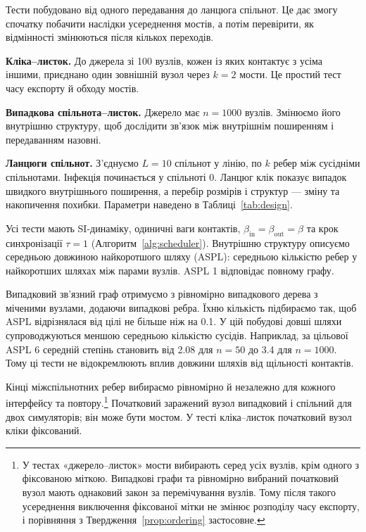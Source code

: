 \documentclass[a4paper,fleqn]{cas-sc}
\begin{document}
Тести побудовано від одного передавання до ланцюга спільнот. Це дає змогу спочатку побачити наслідки усереднення мостів, а потім перевірити, як відмінності змінюються після кількох переходів.
\par \textbf{Кліка--листок.} До джерела зі 100 вузлів, кожен із яких контактує з усіма іншими, приєднано один зовнішній вузол через $k=2$ мости. Це простий тест часу експорту й обходу мостів.
\par \textbf{Випадкова спільнота--листок.} Джерело має $n=1000$ вузлів. Змінюємо його внутрішню структуру, щоб дослідити зв'язок між внутрішнім поширенням і передаванням назовні.
\par \textbf{Ланцюги спільнот.} З'єднуємо $L=10$ спільнот у лінію, по $k$ ребер між сусідніми спільнотами. Інфекція починається у спільноті 0. Ланцюг клік показує випадок швидкого внутрішнього поширення, а перебір розмірів і структур --- зміну та накопичення похибки. Параметри наведено в Таблиці~\ref{tab:design}.
\par Усі тести мають SI-динаміку, одиничні ваги контактів, $\beta_{\mathrm{in}}=\beta_{\mathrm{out}}=\beta$ та крок синхронізації $\tau=1$ (Алгоритм~\ref{alg:scheduler}). Внутрішню структуру описуємо середньою довжиною найкоротшого шляху (ASPL): середньою кількістю ребер у найкоротших шляхах між парами вузлів. ASPL 1 відповідає повному графу.
\par Випадковий зв'язний граф отримуємо з рівномірно випадкового дерева з міченими вузлами, додаючи випадкові ребра. Їхню кількість підбираємо так, щоб ASPL відрізнялася від цілі не більше ніж на 0.1. У цій побудові довші шляхи супроводжуються меншою середньою кількістю сусідів. Наприклад, за цільової ASPL 6 середній степінь становить від 2.08 для $n=50$ до 3.4 для $n=1000$. Тому ці тести не відокремлюють вплив довжини шляхів від щільності контактів.
\par Кінці міжспільнотних ребер вибираємо рівномірно й незалежно для кожного інтерфейсу та повтору.\footnote{У тестах «джерело--листок» мости вибирають серед усіх вузлів, крім одного з фіксованою міткою. Випадкові графи та рівномірно вибраний початковий вузол мають однаковий закон за перемічування вузлів. Тому після такого усереднення виключення фіксованої мітки не змінює розподілу часу експорту, і порівняння з Твердження~\ref{prop:ordering} застосовне.} Початковий заражений вузол випадковий і спільний для двох симуляторів; він може бути мостом. У тесті кліка--листок початковий вузол кліки фіксований.
\end{document}
